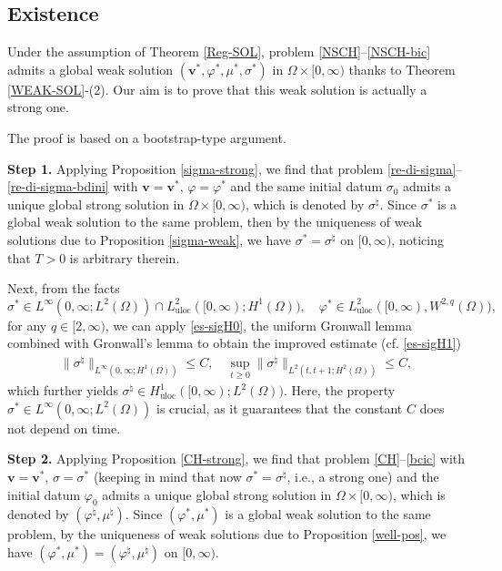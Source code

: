 \documentclass[11pt,reqno]{amsart}
\newcommand{\uloc}{\operatorname{uloc}}
\def\vv{\bm{v}}
\begin{document}
\subsection{Existence}
\label{exe-glo-strong}
Under the assumption of Theorem \ref{Reg-SOL}, problem \eqref{NSCH}--\eqref{NSCH-bic} admits a global weak solution $(\vv^*, \varphi^*, \mu^*, \sigma^*)$ in $\Omega\times [0,\infty)$ thanks to Theorem \ref{WEAK-SOL}-(2). Our aim is to prove that this weak solution is actually a strong one.

The proof is based on a bootstrap-type argument.
\smallskip

\textbf{Step 1.} Applying Proposition \ref{sigma-strong}, we find that problem \eqref{re-di-sigma}--\eqref{re-di-sigma-bdini} with $\vv=\vv^*$, $\varphi=\varphi^*$ and the same initial datum $\sigma_0$ admits a unique global strong solution in $\Omega\times [0,\infty)$, which is denoted by $\sigma^\natural$. Since $\sigma^*$ is a global weak solution to the same problem, then by the uniqueness of weak solutions due to Proposition \ref{sigma-weak}, we have $\sigma^*=\sigma^\natural$ on $[0,\infty)$, noticing that $T>0$ is arbitrary therein.

Next, from the facts
$$
\sigma^* \in L^\infty(0,\infty; L^2(\Omega)) \cap L^2_{\uloc}([0,\infty);H^1(\Omega)),\quad \varphi^* \in L_{\uloc}^2([0,\infty),W^{2,q}(\Omega)),
$$
for any $q\in [2,\infty)$, we can apply \eqref{es-sigH0}, the uniform Gronwall lemma combined with Gronwall's lemma to obtain the improved estimate (cf. \eqref{es-sigH1})
%
\begin{align}
\|\sigma^\natural\|_{L^\infty(0,\infty;H^1(\Omega))}\leq C,\quad \sup_{t\geq 0}\|\sigma^\natural\|_{L^2(t,t+1;H^2(\Omega))}\leq C,
\label{es-sigH1-i}
\end{align}
%
which further yields $\sigma^\natural\in H^1_{\uloc}([0,\infty);L^2(\Omega))$.
Here, the property $\sigma^* \in L^\infty(0,\infty; L^2(\Omega))$ is crucial, as it guarantees that the constant $C$ does not depend on time.
\smallskip

\textbf{Step 2.} Applying Proposition \ref{CH-strong}, we find that problem \eqref{CH}--\eqref{bcic} with $\vv=\vv^*$, $\sigma=\sigma^*$ (keeping in mind that now  $\sigma^*=\sigma^\natural$, i.e., a strong one) and the initial datum $\varphi_0$ admits a unique global strong solution in $\Omega\times [0,\infty)$, which is denoted by $(\varphi^\natural,\mu^\natural)$.
Since $(\varphi^*,\mu^*)$ is a global weak solution to the same problem, by the uniqueness of weak solutions due to Proposition \ref{well-pos}, we have $(\varphi^*,\mu^*)=(\varphi^\natural,\mu^\natural)$ on $[0,\infty)$.
\end{document}
